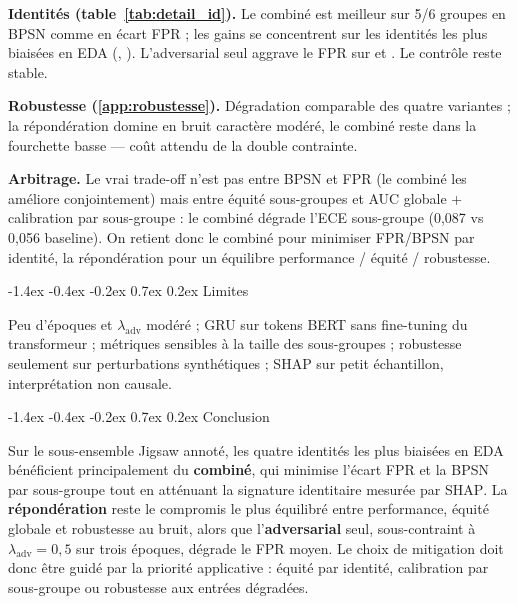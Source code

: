 \documentclass[a4paper,10pt]{article}
\makeatletter
\renewcommand\section{\@startsection{section}{1}{\z@}%
  {-1.4ex \@plus -0.4ex \@minus -0.2ex}%
  {0.7ex \@plus 0.2ex}%
  {\normalfont\large\bfseries}}
\makeatother
\begin{document}
\textbf{Identités (table~\ref{tab:detail_id}).} Le combiné est meilleur sur 5/6 groupes en BPSN comme en écart FPR ; les gains se concentrent sur les identités les plus biaisées en EDA (, ). L'adversarial seul aggrave le FPR sur  et . Le contrôle  reste stable.

\textbf{Robustesse (\ref{app:robustesse}).} Dégradation comparable des quatre variantes ; la répondération domine en bruit caractère modéré, le combiné reste dans la fourchette basse — coût attendu de la double contrainte.

\textbf{Arbitrage.} Le vrai trade-off n'est pas entre BPSN et FPR (le combiné les améliore conjointement) mais entre équité sous-groupes et AUC globale + calibration par sous-groupe : le combiné dégrade l'ECE sous-groupe (0,087 vs 0,056 baseline). On retient donc le combiné pour minimiser FPR/BPSN par identité, la répondération pour un équilibre performance / équité / robustesse.

\section{Limites}

Peu d'époques et $\lambda_{\text{adv}}$ modéré ; GRU sur tokens BERT sans fine-tuning du transformeur ; métriques sensibles à la taille des sous-groupes ; robustesse seulement sur perturbations synthétiques ; \textsc{SHAP} sur petit échantillon, interprétation non causale.

\section{Conclusion}

Sur le sous-ensemble Jigsaw annoté, les quatre identités les plus biaisées en EDA bénéficient principalement du \textbf{combiné}, qui minimise l'écart FPR et la BPSN par sous-groupe tout en atténuant la signature identitaire mesurée par \textsc{SHAP}. La \textbf{répondération} reste le compromis le plus équilibré entre performance, équité globale et robustesse au bruit, alors que l'\textbf{adversarial} seul, sous-contraint à $\lambda_{\text{adv}}=0{,}5$ sur trois époques, dégrade le FPR moyen. Le choix de mitigation doit donc être guidé par la priorité applicative : équité par identité, calibration par sous-groupe ou robustesse aux entrées dégradées.

\clearpage
\appendix
\renewcommand{\thesection}{Annexe~\Alph{section}}
\end{document}
